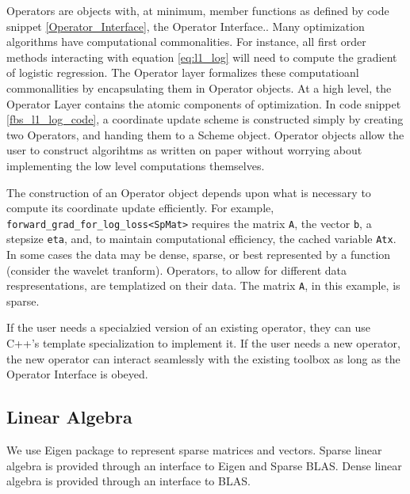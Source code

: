 Operators are objects with, at minimum, member functions as defined by code snippet \ref{Operator_Interface}, the Operator Interface..
Many optimization algorithms  have computational commonalities.
For instance, all first order methods interacting with equation \ref{eq:l1_log} will need to compute the gradient of logistic regression.
The Operator layer formalizes these computatioanl commonallities by encapsulating them in Operator objects.
At a high level, the Operator Layer contains the atomic components of optimization.
In code snippet \ref{fbs_l1_log_code}, a coordinate update scheme is constructed simply by creating two Operators, and handing them to a Scheme object.
Operator objects allow the user to construct algorihtms as written on paper without worrying about implementing the low level computations themselves.

The construction of an Operator object depends upon what is necessary to compute its coordinate update efficiently.
For example, \texttt{forward\_grad\_for\_log\_loss<SpMat>} requires the matrix \texttt{A}, the vector \texttt{b}, a stepsize \texttt{eta},  and, to maintain computational efficiency, the cached variable \texttt{Atx}.
In some cases the data may be dense, sparse, or best represented by a function (consider the wavelet tranform).
Operators, to allow for different data respresentations, are templatized on their data.
The matrix \texttt{A}, in this example, is sparse.

If the user needs a specialzied version of an existing operator, they can use C++'s template specialization to implement it.
If the user needs a new operator,  the new operator can interact seamlessly with the existing toolbox as long as the Operator Interface is obeyed.





\subsection{Linear Algebra}

We use Eigen package to represent sparse matrices and vectors. 
Sparse linear algebra is provided through an interface to Eigen and Sparse BLAS.
Dense linear algebra is provided through an interface to BLAS. 







